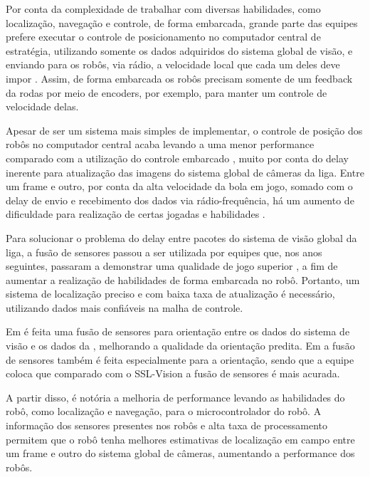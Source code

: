 \documentclass[acronym, symbols, table]{fei}
\begin{document}
				Por conta da complexidade de trabalhar com diversas habilidades, como localização, navegação e controle, de forma embarcada, grande parte das equipes prefere executar o controle de posicionamento no computador central de estratégia, utilizando somente os dados adquiridos do sistema global de visão, e enviando para os robôs, via rádio, a velocidade local que cada um deles deve impor \cite{ubc_thunderbots_2015, immortals_2023}. Assim, de forma embarcada os robôs precisam somente de um feedback da rodas por meio de encoders, por exemplo, para manter um controle de velocidade delas.
				
				Apesar de ser um sistema mais simples de implementar, o controle de posição dos robôs no computador central acaba levando a uma menor performance comparado com a utilização do controle embarcado \cite{ubc_thunderbots_2015}, muito por conta do delay inerente para atualização das imagens do sistema global de câmeras da liga. Entre um frame e outro, por conta da alta velocidade da bola em jogo, somado com o delay de envio e recebimento dos dados via rádio-frequência, há um aumento de dificuldade para realização de certas jogadas e habilidades \cite{immortals_2023}.
				
				Para solucionar o problema do delay entre pacotes do sistema de visão global da liga, a fusão de sensores passou a ser utilizada por equipes que, nos anos seguintes, passaram a demonstrar uma qualidade de jogo superior \cite{zjunlict_2018, tigers_2013, ubc_thunderbots_2015, ubc_thunderbots_2017, immortals_2023, parsian_2015}, a fim de aumentar a realização de habilidades de forma embarcada no robô. Portanto, um sistema de localização preciso e com baixa taxa de atualização é necessário, utilizando dados mais confiáveis na malha de controle.
				
				Em \textcite{immortals_2023} é feita uma fusão de sensores para orientação entre os dados do sistema de visão e os dados da , melhorando a qualidade da orientação predita. Em \textcite{parsian_2019} a fusão de sensores também é feita especialmente para a orientação, sendo que a equipe coloca que comparado com o SSL-Vision a fusão de sensores é mais acurada.
				
				A partir disso, é notória a melhoria de performance levando as habilidades do robô, como localização e navegação, para o microcontrolador do robô. A informação dos sensores presentes nos robôs e alta taxa de processamento permitem que o robô tenha melhores estimativas de localização em campo entre um frame e outro do sistema global de câmeras, aumentando a performance dos robôs.
		
\end{document}
